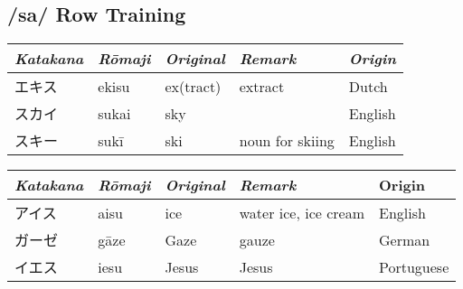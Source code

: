 \subsection{/sa/ Row Training}\label{sec:SaRowTraining}
\Padding
\begin{longtable}[c]{p{2cm}p{2cm}p{3cm}p{6cm}p{2cm}}
\textit{Katakana}&\textit{Rōmaji}&\textit{Original}&\textit{Remark}&\textit{Origin}\\\hline
エキス&ekisu&ex(tract)&extract&Dutch\\
スカイ&sukai&sky&&English\\
スキー&sukī&ski&noun for skiing&English\\
\end{longtable}


\newpage

\Padding
\begin{longtable}[c]{p{2cm}p{2cm}p{3cm}p{6cm}p{2cm}}
\textit{Katakana}&\textit{Rōmaji}&\textit{Original}&\textit{Remark}&Origin\\\hline
アイス&aisu&ice&water ice, ice cream&English\\
ガーゼ&gāze&Gaze&gauze&German\\
イエス&iesu&Jesus&Jesus&Portuguese\\
\end{longtable}


\newpage
